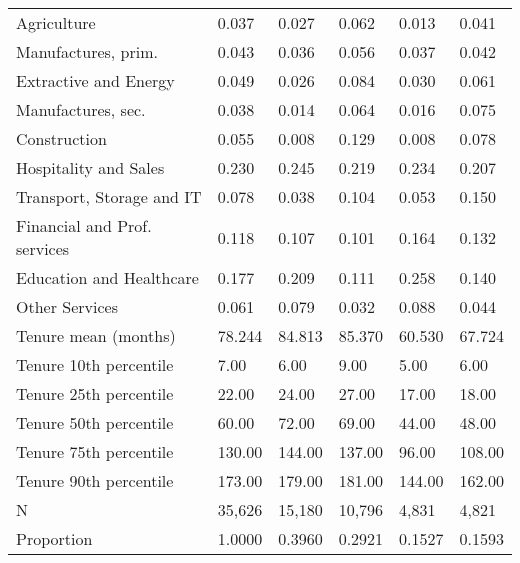 \begin{tabular}{llllll}
Agriculture                  &   0.037 &   0.027 &   0.062 &              0.013 &            0.041 \\
Manufactures, prim.          &   0.043 &   0.036 &   0.056 &              0.037 &            0.042 \\
Extractive and Energy        &   0.049 &   0.026 &   0.084 &              0.030 &            0.061 \\
Manufactures, sec.           &   0.038 &   0.014 &   0.064 &              0.016 &            0.075 \\
Construction                 &   0.055 &   0.008 &   0.129 &              0.008 &            0.078 \\
Hospitality and Sales        &   0.230 &   0.245 &   0.219 &              0.234 &            0.207 \\
Transport, Storage and IT    &   0.078 &   0.038 &   0.104 &              0.053 &            0.150 \\
Financial and Prof. services &   0.118 &   0.107 &   0.101 &              0.164 &            0.132 \\
Education and Healthcare     &   0.177 &   0.209 &   0.111 &              0.258 &            0.140 \\
Other Services               &   0.061 &   0.079 &   0.032 &              0.088 &            0.044 \\
Tenure mean (months)         &  78.244 &  84.813 &  85.370 &             60.530 &           67.724 \\
Tenure 10th percentile       &    7.00 &    6.00 &    9.00 &               5.00 &             6.00 \\
Tenure 25th percentile       &   22.00 &   24.00 &   27.00 &              17.00 &            18.00 \\
Tenure 50th percentile       &   60.00 &   72.00 &   69.00 &              44.00 &            48.00 \\
Tenure 75th percentile       &  130.00 &  144.00 &  137.00 &              96.00 &           108.00 \\
Tenure 90th percentile       &  173.00 &  179.00 &  181.00 &             144.00 &           162.00 \\
N                            &  35,626 &  15,180 &  10,796 &              4,831 &            4,821 \\
Proportion                   &  1.0000 &  0.3960 &  0.2921 &             0.1527 &           0.1593 \\
\bottomrule
\end{tabular}
